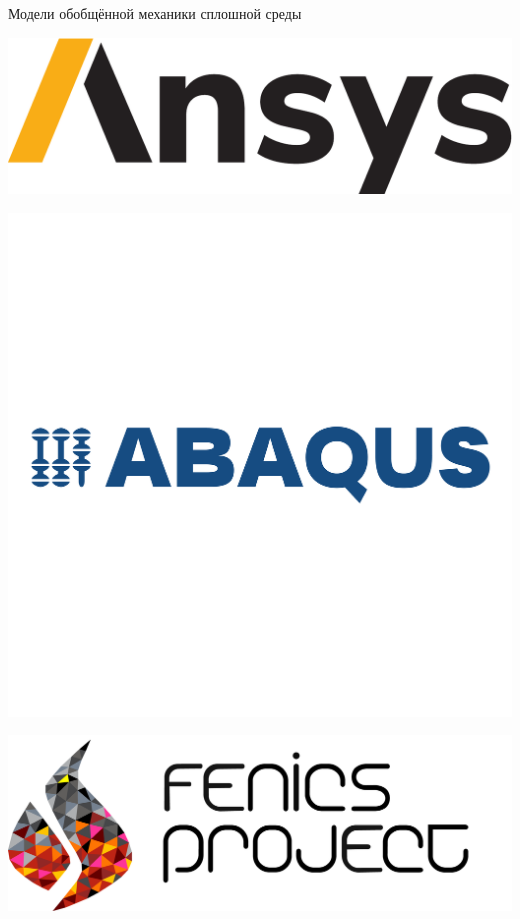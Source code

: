 \begin{frame}{Модели обобщённой механики сплошной среды}
	\begin{minipage}{0.32\linewidth}\centering
		\includegraphics[width=\textwidth]{pics/ansys.pdf}
	\end{minipage}
    \hfill
    \begin{minipage}{0.32\linewidth}\centering
        \includegraphics[width=\linewidth]{pics/abaqus.pdf}
    \end{minipage}
    \hfill
    \begin{minipage}{0.32\linewidth}\centering
        \includegraphics[width=\linewidth]{pics/FeNiCs.png}
    \end{minipage}
\end{frame}

